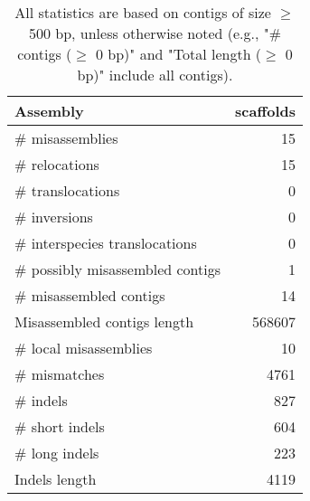 \documentclass[12pt,a4paper]{article}
\begin{document}
\begin{table}[ht]
\begin{center}
\caption{All statistics are based on contigs of size $\geq$ 500 bp, unless otherwise noted (e.g., "\# contigs ($\geq$ 0 bp)" and "Total length ($\geq$ 0 bp)" include all contigs).}
\begin{tabular}{|l*{1}{|r}|}
\hline
Assembly & scaffolds \\ \hline
\# misassemblies & 15 \\ \hline
\hspace{5mm}\# relocations & 15 \\ \hline
\hspace{5mm}\# translocations & 0 \\ \hline
\hspace{5mm}\# inversions & 0 \\ \hline
\hspace{5mm}\# interspecies translocations & 0 \\ \hline
\# possibly misassembled contigs & 1 \\ \hline
\# misassembled contigs & 14 \\ \hline
Misassembled contigs length & 568607 \\ \hline
\# local misassemblies & 10 \\ \hline
\# mismatches & 4761 \\ \hline
\# indels & 827 \\ \hline
\hspace{5mm}\# short indels & 604 \\ \hline
\hspace{5mm}\# long indels & 223 \\ \hline
Indels length & 4119 \\ \hline
\end{tabular}
\end{center}
\end{table}
\end{document}
